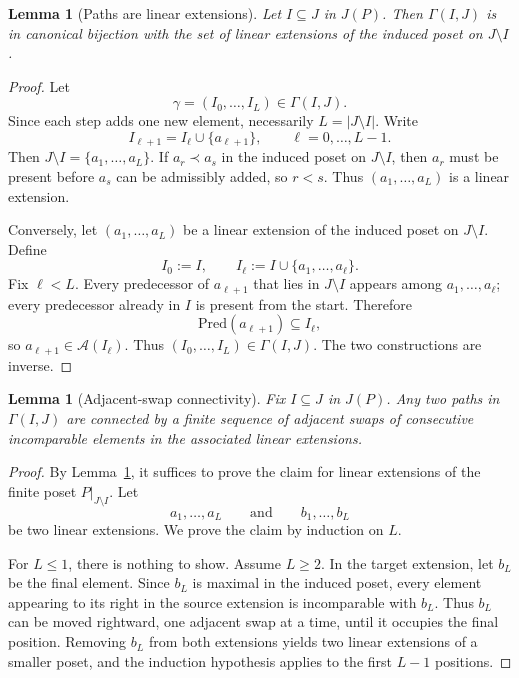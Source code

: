 \documentclass{article}
\newtheorem{lemma}[theorem]{Lemma}
\theoremstyle{definition}
\begin{document}
\begin{lemma}[Paths are linear extensions]
\label{lem:linext-app}
Let \(I\subseteq J\) in \(J(P)\). Then \(\Gamma(I,J)\) is in canonical bijection with the set of linear extensions of the induced poset on \(J\setminus I\).
\end{lemma}

\begin{proof}
Let
\[
\gamma=(I_0,\dots,I_L)\in \Gamma(I,J).
\]
Since each step adds one new element, necessarily \(L=|J\setminus I|\). Write
\[
I_{\ell+1}=I_\ell\cup\{a_{\ell+1}\},
\qquad \ell=0,\dots,L-1.
\]
Then \(J\setminus I=\{a_1,\dots,a_L\}\). If \(a_r\prec a_s\) in the induced poset on \(J\setminus I\), then \(a_r\) must be present before \(a_s\) can be admissibly added, so \(r<s\). Thus \((a_1,\dots,a_L)\) is a linear extension.

Conversely, let \((a_1,\dots,a_L)\) be a linear extension of the induced poset on \(J\setminus I\). Define
\[
I_0:=I,\qquad I_\ell:=I\cup\{a_1,\dots,a_\ell\}.
\]
Fix \(\ell<L\). Every predecessor of \(a_{\ell+1}\) that lies in \(J\setminus I\) appears among \(a_1,\dots,a_\ell\); every predecessor already in \(I\) is present from the start. Therefore
\[
\mathrm{Pred}(a_{\ell+1})\subseteq I_\ell,
\]
so \(a_{\ell+1}\in \mathcal A(I_\ell)\). Thus \((I_0,\dots,I_L)\in \Gamma(I,J)\). The two constructions are inverse.
\end{proof}

\begin{lemma}[Adjacent-swap connectivity]
\label{lem:adj-swap-app}
Fix \(I\subseteq J\) in \(J(P)\). Any two paths in \(\Gamma(I,J)\) are connected by a finite sequence of adjacent swaps of consecutive incomparable elements in the associated linear extensions.
\end{lemma}

\begin{proof}
By Lemma~\ref{lem:linext-app}, it suffices to prove the claim for linear extensions of the finite poset \(P|_{J\setminus I}\). Let
\[
a_1,\dots,a_L
\qquad\text{and}\qquad
b_1,\dots,b_L
\]
be two linear extensions. We prove the claim by induction on \(L\).

For \(L\le 1\), there is nothing to show. Assume \(L\ge 2\). In the target extension, let \(b_L\) be the final element. Since \(b_L\) is maximal in the induced poset, every element appearing to its right in the source extension is incomparable with \(b_L\). Thus \(b_L\) can be moved rightward, one adjacent swap at a time, until it occupies the final position. Removing \(b_L\) from both extensions yields two linear extensions of a smaller poset, and the induction hypothesis applies to the first \(L-1\) positions.
\end{proof}
\end{document}
